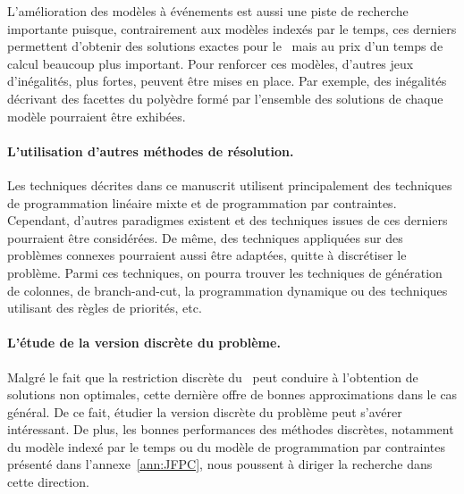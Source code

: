 L'amélioration des modèles à événements est aussi une piste de
recherche importante puisque, contrairement aux modèles indexés par le
temps, ces derniers permettent d'obtenir des solutions exactes pour le
\CECSP~mais au prix d'un temps de calcul beaucoup plus important. Pour
renforcer ces modèles, d'autres jeux d'inégalités, plus fortes,
peuvent être mises en place. Par exemple, des inégalités décrivant des
facettes du polyèdre formé par l'ensemble des solutions de chaque
modèle pourraient être exhibées.

\paragraph{L'utilisation d'autres méthodes de résolution.}
Les techniques décrites dans ce manuscrit utilisent principalement des
techniques de programmation linéaire mixte et de programmation par
contraintes. Cependant, d'autres paradigmes existent et des techniques
issues de ces derniers pourraient être considérées. De même, des
techniques appliquées sur des problèmes connexes pourraient aussi être
adaptées, quitte à discrétiser le problème. Parmi ces techniques, on
pourra trouver les techniques de génération de colonnes, de
branch-and-cut, la programmation dynamique ou des techniques utilisant
des règles de priorités, etc. 


\paragraph{L'étude de la version discrète du problème.} Malgré le fait
que la restriction discrète du \CECSP~peut conduire à l'obtention de
solutions non optimales, cette dernière offre de bonnes approximations
dans le cas général. De ce fait, étudier la version discrète du
problème peut s'avérer intéressant. De plus, les bonnes performances
des méthodes discrètes, notamment du modèle indexé par le temps ou du
modèle de programmation par contraintes présenté dans
l'annexe~\ref{ann:JFPC}, nous poussent à diriger la recherche dans
cette direction. 





